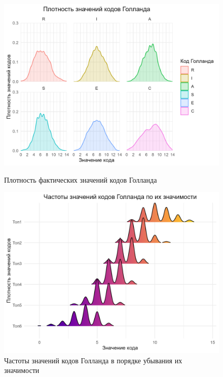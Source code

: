 \begin{figure}[bhtp]
    \centering
    \begin{minipage}[b]{0.49\linewidth}
        \centering
        \includegraphics[width=\linewidth]{figures/facet.png}
        \caption{Плотность фактических значений кодов Голланда}
        \label{fig:facet}
    \end{minipage}
    \hfill
    \begin{minipage}[b]{0.49\linewidth}
        \centering
        \includegraphics[width=\linewidth]{figures/ranks.png}
        \caption{Частоты значений кодов Голланда в порядке убывания их значимости}
        \label{fig:ranks}
    \end{minipage}
\end{figure}

